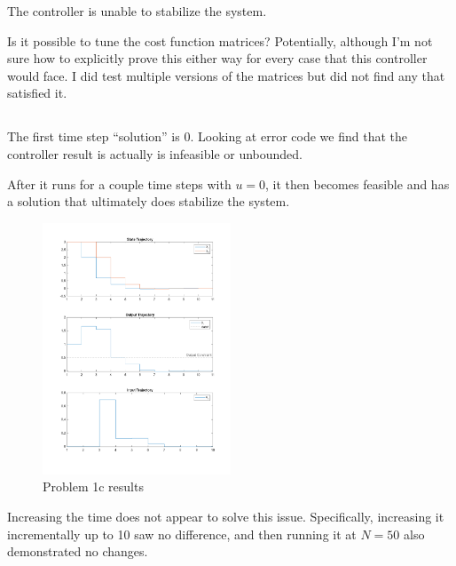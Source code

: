 \documentclass[]{article}
\begin{document}
The controller is unable to stabilize the system.

Is it possible to tune the cost function matrices? 
Potentially, although I'm not sure how to explicitly prove this either way for every case that this controller would face.
I did test multiple versions of the matrices but did not find any that satisfied it.

\newpage
\subsection{}
The first time step ``solution'' is 0.
Looking at error code we find that the controller result is actually is infeasible or unbounded.

After it runs for a couple time steps with $u=0$, it then becomes feasible and has a solution that ultimately does stabilize the system.

\begin{figure}[h]
    \centering
    \includegraphics[width = 0.5\textwidth]{figs/pblm1c.png}
    \caption{Problem 1c results}
\end{figure}

Increasing the time does not appear to solve this issue.
Specifically, increasing it incrementally up to 10 saw no difference, and then running it at $N=50$ also demonstrated no changes.

\newpage
\subsection{}
\end{document}
